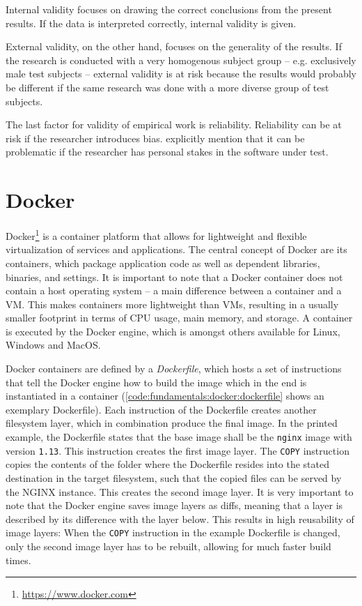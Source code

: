 Internal validity focuses on drawing the correct conclusions from the present results.
If the data is interpreted correctly, internal validity is given.

External validity, on the other hand, focuses on the generality of the results.
If the research is conducted with a very homogenous subject group -- e.g. exclusively male test subjects -- external validity is at risk because the results would probably be different if the same research was done with a more diverse group of test subjects.

The last factor for validity of empirical work is reliability.
Reliability can be at risk if the researcher introduces bias.
\citeauthor{Easterbrook2008a} explicitly mention that it can be problematic if the researcher has personal stakes in the software under test.

\section{Docker}
\label{sec:fundamentals:docker}

Docker\footnote{\url{https://www.docker.com}} is a container platform that allows for lightweight and flexible virtualization of services and applications.
The central concept of Docker are its containers, which package application code as well as dependent libraries, binaries, and settings.
It is important to note that a Docker container does not contain a host operating system -- a main difference between a container and a \ac{VM}.
This makes containers more lightweight than \ac{VM}s, resulting in a usually smaller footprint in terms of CPU usage, main memory, and storage.
A container is executed by the Docker engine, which is amongst others available for Linux, Windows and MacOS.

Docker containers are defined by a \emph{Dockerfile}, which hosts a set of instructions that tell the Docker engine how to build the image which in the end is instantiated in a container (\cref{code:fundamentals:docker:dockerfile} shows an exemplary Dockerfile).
Each instruction of the Dockerfile creates another filesystem layer, which in combination produce the final image.
In the printed example, the Dockerfile states that the base image shall be the \texttt{nginx} image with version \texttt{1.13}.
This instruction creates the first image layer.
The \texttt{COPY} instruction copies the contents of the folder where the Dockerfile resides into the stated destination in the target filesystem, such that the copied files can be served by the NGINX instance.
This creates the second image layer.
It is very important to note that the Docker engine saves image layers as diffs, meaning that a layer is described by its  difference with the layer below.
This results in high reusability of image layers: When the \texttt{COPY} instruction in the example Dockerfile is changed, only the second image layer has to be rebuilt, allowing for much faster build times.

